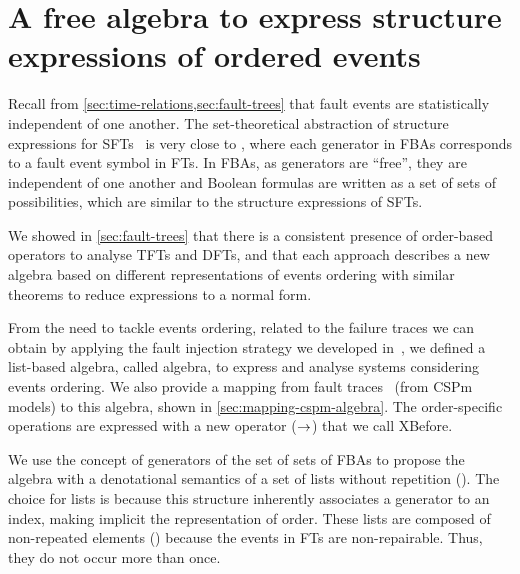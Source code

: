  \chapter{A free algebra to express structure expressions of ordered events}
\label{chap:algebra}

Recall from \cref{sec:time-relations,sec:fault-trees} that fault events are statistically independent of one another.
The set-theoretical abstraction of structure expressions for \acp{SFT}~\cite[pp. VI-11]{VGR+1981} is very close to , where each generator in \acp{FBA} corresponds to a fault event symbol in \aclp{FT}.
In \acp{FBA}, as generators are ``free'', they are independent of one another and Boolean formulas are written as a set of sets of possibilities, which are similar to the structure expressions of \acp{SFT}.

We showed in \cref{sec:fault-trees} that there is a consistent presence of order-based operators to analyse \acp{TFT} and \acp{DFT}, and that each approach describes a new algebra based on different representations of events ordering with similar theorems to reduce expressions to a normal form.

From the need to tackle events ordering, related to the failure traces we can obtain by applying the fault injection strategy we developed in~\cite{DM2012}, we defined a list-based algebra, called \acf{algebra}, to express and analyse systems considering events ordering.
We also provide a mapping from fault traces~\cite{DM2012} (from \ac{CSPm} models) to this algebra, shown in \cref{sec:mapping-cspm-algebra}.
The order-specific operations are expressed with a new operator ($\rightarrow$) that we call \ac{XBefore}.

We use the concept of generators of the set of sets of \acp{FBA} to propose the \ac{algebra} with a denotational semantics of a set of lists without repetition (\distinctlists).
The choice for lists is because this structure inherently associates a generator to an index, making implicit the representation of order.
These lists are composed of non-repeated elements (\distinctlists) because the events in \aclp{FT} are non-repairable.
Thus, they do not occur more than once.

